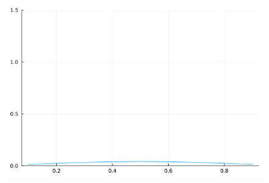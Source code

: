 \documentclass[a4paper,10pt,BCOR10mm,oneside,headsepline]{scrartcl}
\begin{document}
\begin{figure}[h]
\centering
\includegraphics[scale=0.4]{heatPlotStep1.png}
\end{figure}

\newpage
\end{document}
